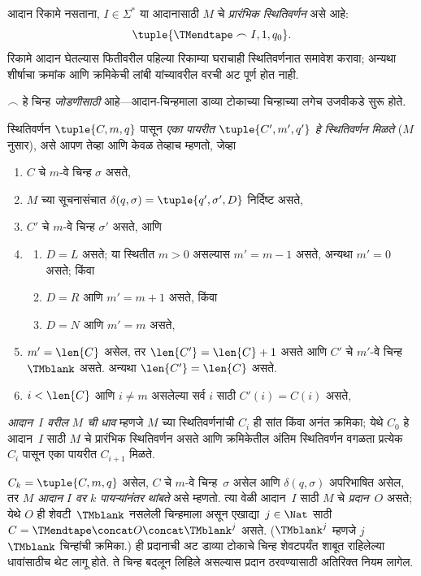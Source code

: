 \begin{defn}[प्रारंभिक स्थितिवर्णन]
आदान रिकामे नसताना, $I \in \Sigma^*$ या आदानासाठी $M$ चे \emph{प्रारंभिक स्थितिवर्णन}
असे आहे:
\[\tuple{\TMendtape \frown I, 1, q_0}.
\]
रिकामे आदान घेतल्यास फितीवरील पहिल्या रिकाम्या घराचाही
स्थितिवर्णनात समावेश करावा; अन्यथा शीर्षाचा क्रमांक आणि क्रमिकेची
लांबी यांच्यावरील वरची अट पूर्ण होत नाही.

\end{defn}

\begin{explain}
$\frown$ हे चिन्ह \emph{जोडणीसाठी} आहे---आदान-चिन्हमाला डाव्या
टोकाच्या चिन्हाच्या लगेच उजवीकडे सुरू होते.

\end{explain}

\begin{defn}
स्थितिवर्णन $\tuple{C, m, q}$ पासून \emph{एका पायरीत
$\tuple{C', m', q'}$ हे स्थितिवर्णन मिळते} ($M$ नुसार), असे आपण
तेव्हा आणि केवळ तेव्हाच म्हणतो, जेव्हा
\begin{enumerate}
\item $C$ चे $m$-वे चिन्ह $\sigma$ असते,
\item $M$ च्या सूचनासंचात $\delta(q, \sigma) =
  \tuple{q', \sigma', D}$ निर्दिष्ट असते,
\item $C'$ चे $m$-वे चिन्ह $\sigma'$ असते, आणि
\item
\begin{enumerate}
\item $D = L$ असते; या स्थितीत $m>0$ असल्यास $m' = m - 1$ असते, अन्यथा $m'=0$ असते; किंवा
\item $D = R$ आणि $m' = m + 1$ असते, किंवा
\item $D = N$ आणि $m' = m$ असते,
\end{enumerate}
\item $m' = \len{C}$ असेल, तर $\len{C'} = \len{C} + 1$ असते आणि
  $C'$ चे $m'$-वे चिन्ह~$\TMblank$ असते. अन्यथा $\len{C'}=\len{C}$ असते.
\item $i < \len{C}$ आणि $i \neq m$ असलेल्या सर्व $i$ साठी $C'(i) = C(i)$ असते,
\end{enumerate}
\end{defn}

\begin{defn}\label{cmp:tur:con:defn:run-output}
\emph{आदान~$I$ वरील $M$ ची धाव} म्हणजे $M$ च्या स्थितिवर्णनांची
$C_i$ ही सांत किंवा अनंत क्रमिका; येथे $C_0$ हे आदान~$I$ साठी $M$ चे प्रारंभिक
स्थितिवर्णन असते आणि क्रमिकेतील अंतिम स्थितिवर्णन वगळता प्रत्येक $C_i$ पासून एका पायरीत $C_{i+1}$
मिळते.


$C_k = \tuple{C, m, q}$ असेल, $C$ चे $m$-वे चिन्ह~$\sigma$ असेल
आणि $\delta(q,
\sigma)$ अपरिभाषित असेल, तर $M$ \emph{आदान $I$ वर $k$
पायऱ्यांनंतर थांबते} असे म्हणतो. त्या वेळी आदान~$I$ साठी $M$ चे
\emph{प्रदान}~$O$ असते; येथे $O$ ही शेवटी~$\TMblank$ नसलेली
चिन्हमाला असून एखाद्या~$j \in \Nat$ साठी
$C = \TMendtape \concat O \concat \TMblank^j$ असते.
($\TMblank^j$ म्हणजे $j$ $\TMblank$ चिन्हांची क्रमिका.)
ही प्रदानाची अट डाव्या टोकाचे चिन्ह शेवटपर्यंत शाबूत राहिलेल्या
धावांसाठीच थेट लागू होते. ते चिन्ह बदलून लिहिले असल्यास प्रदान
ठरवण्यासाठी अतिरिक्त नियम लागेल.

\end{defn}

